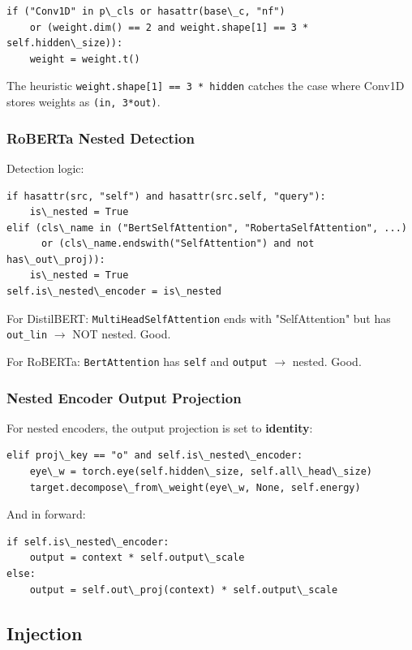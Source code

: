 \begin{lstlisting}
if ("Conv1D" in p\_cls or hasattr(base\_c, "nf")
    or (weight.dim() == 2 and weight.shape[1] == 3 * self.hidden\_size)):
    weight = weight.t()
\end{lstlisting}

The heuristic \texttt{weight.shape[1] == 3 * hidden} catches the case where 
Conv1D stores weights as \texttt{(in, 3*out)}.

\subsubsection{RoBERTa Nested Detection}

Detection logic:

\begin{lstlisting}
if hasattr(src, "self") and hasattr(src.self, "query"):
    is\_nested = True
elif (cls\_name in ("BertSelfAttention", "RobertaSelfAttention", ...)
      or (cls\_name.endswith("SelfAttention") and not has\_out\_proj)):
    is\_nested = True
self.is\_nested\_encoder = is\_nested
\end{lstlisting}

For DistilBERT: \texttt{MultiHeadSelfAttention} ends with "SelfAttention" but 
has \texttt{out\_lin} $\to$ NOT nested. Good.

For RoBERTa: \texttt{BertAttention} has \texttt{self} and \texttt{output} $\to$ nested. Good.

\subsubsection{Nested Encoder Output Projection}

For nested encoders, the output projection is set to \textbf{identity}:

\begin{lstlisting}
elif proj\_key == "o" and self.is\_nested\_encoder:
    eye\_w = torch.eye(self.hidden\_size, self.all\_head\_size)
    target.decompose\_from\_weight(eye\_w, None, self.energy)
\end{lstlisting}

And in forward:

\begin{lstlisting}
if self.is\_nested\_encoder:
    output = context * self.output\_scale
else:
    output = self.out\_proj(context) * self.output\_scale
\end{lstlisting}

\subsection{Injection}

